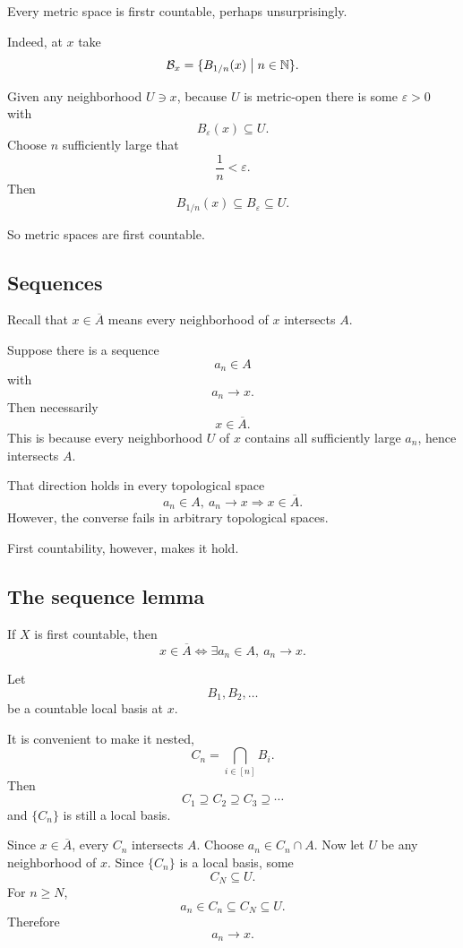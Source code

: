 \documentclass[11pt]{article}
\begin{document}
Every metric space is firstr countable, perhaps 
unsurprisingly. 

Indeed, at $x$ take 
\[
    \mathcal B_x = \{B_{1/n}(x) \bigm| n \in \mathbb N\}. 
\] 

Given any neighborhood $U \ni x$, because $U$ is 
metric-open there is some $\varepsilon > 0$ with 
\[
    B_{\varepsilon}(x) \subseteq U. 
\]
Choose $n$ sufficiently large that 
\[
    \frac{1}{n} < \varepsilon. 
\]
Then 
\[
    B_{1/n}(x) \subseteq B_{\varepsilon} \subseteq U. 
\]

So metric spaces are first countable. 

\subsection{Sequences}

Recall that $x \in \overline A$ means 
every neighborhood of $x$ intersects $A$. 

Suppose there is a sequence 
\[
    a_n \in A 
\]
with 
\[
    a_n \to x. 
\]
Then necessarily 
\[
    x \in \overline A. 
\]
This is because every neighborhood $U$ of $x$ 
contains all sufficiently large $a_n$, hence 
intersects $A$. 

That direction holds in every topological space 
\[
    a_n \in A, \ a_n \to x \Rightarrow x \in \overline A. 
\]
However, the converse fails in arbitrary topological spaces. 

First countability, however, makes it hold. 

\subsection{The sequence lemma}

If $X$ is first countable, then 
\[
    x \in \overline A \Leftrightarrow \exists a_n \in A, 
    \ a_n \to x.  
\]

Let 
\[
    B_1,B_2,\ldots 
\]
be a countable local basis at $x$. 

It is convenient to make it nested, 
\[
    C_n = \bigcap_{i\in[n]} B_i. 
\]
Then 
\[
    C_1 \supseteq C_2 \supseteq C_3 \supseteq \cdots 
\]
and $\{C_n\}$ is still a local basis. 

Since $x \in \overline A$, every $C_n$ intersects $A$. 
Choose $a_n \in C_n \cap A$. Now let $U$ be any neighborhood 
of $x$. Since $\{C_n\}$ is a local basis, some 
\[
    C_N \subseteq U. 
\]
For $n \geq N$, 
\[
    a_n \in C_n \subseteq C_N \subseteq U. 
\]
Therefore 
\[
    a_n \to x. 
\]
\end{document}
